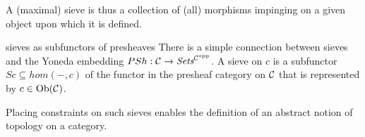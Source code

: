 \begin{frame}
A (maximal) sieve is thus a collection of (all) morphisms impinging on a given object upon which it is defined. 
\begin{block}{sieves as subfunctors of presheaves}
There is a simple connection between sieves and the Yoneda embedding $PSh:{\mathcal C} \rightarrow \textit{Sets}^{{\mathcal C}^{opp}}$. A sieve on $c$ is a subfunctor $Sc \subseteq hom(-,c)$ of the functor in the presheaf category on ${\mathcal C}$ that is represented by $c \in \mathop{\rm Ob}\nolimits({\mathcal C})$. 
\end{block}
Placing constraints on such sieves enables the definition of an abstract notion of topology on a category.
\end{frame}
